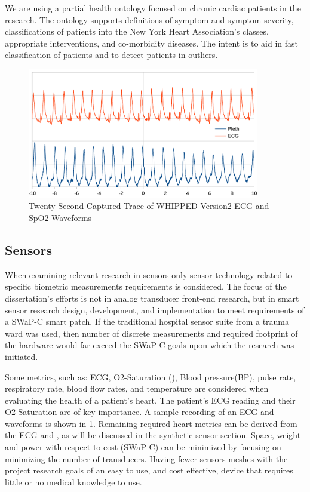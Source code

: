 We are using a partial health ontology focused on chronic cardiac patients in the research. The ontology supports definitions of symptom and symptom-severity, classifications of patients into the New York Heart Association's classes, appropriate interventions, and co-morbidity diseases. The intent is to aid in fast classification of patients and to detect patients in outliers.


\begin{figure}
	\begin{center}
		
		\includegraphics[scale=1,width=0.9\textwidth]{Images/20second.pdf} 
		\caption{Twenty Second Captured Trace of WHIPPED Version2 ECG and SpO2 Waveforms}
		\label{fig:20SecondEcg}
	\end{center}
\end{figure}


\subsection{Sensors}
\label{subsec:Sensors}
When examining relevant research in sensors only sensor technology related to specific biometric measurements requirements is considered. The focus of the dissertation's efforts is not in analog transducer front-end research, but in smart sensor research design, development, and implementation to meet requirements of a SWaP-C smart patch. If the traditional hospital sensor suite from a trauma ward was used, then number of discrete measurements and required footprint of the hardware would far exceed the SWaP-C goals upon which the research was initiated.

Some metrics, such as: ECG, O2-Saturation (), Blood pressure(BP), pulse rate, respiratory rate, blood flow rates, and temperature are considered when evaluating the health of a patient's heart. The patient's ECG reading and their O2 Saturation are of key importance. A sample recording of an ECG and  waveforms is shown in \ref{fig:20SecondEcg}. Remaining required heart metrics can be derived from the ECG and , as will be discussed in the synthetic sensor section. Space, weight and power with respect to cost (SWaP-C) can be minimized by focusing on minimizing the number of transducers. Having fewer sensors meshes with the project research goals of an easy to use, and cost effective, device that requires little or no medical knowledge to use.

